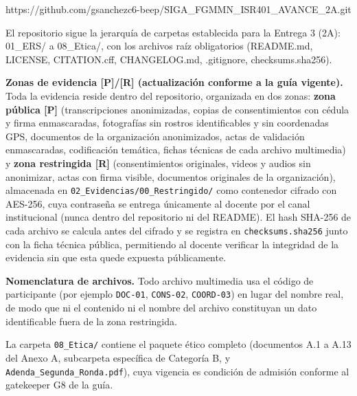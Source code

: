 
https://github.com/gsanchezc6-beep/SIGA\_FGMMN\_ISR401\_AVANCE\_2A.git


El repositorio sigue la jerarquía de carpetas establecida para la Entrega 3 (2A): 01\_ERS/ a 08\_Etica/, con los archivos raíz obligatorios (README.md, LICENSE, CITATION.cff, CHANGELOG.md, .gitignore, checksums.sha256).

\textbf{Zonas de evidencia [P]/[R] (actualización conforme a la guía vigente).} Toda la evidencia reside dentro del repositorio, organizada en dos zonas: \textbf{zona pública [P]} (transcripciones anonimizadas, copias de consentimientos con cédula y firma enmascaradas, fotografías sin rostros identificables y sin coordenadas GPS, documentos de la organización anonimizados, actas de validación enmascaradas, codificación temática, fichas técnicas de cada archivo multimedia) y \textbf{zona restringida [R]} (consentimientos originales, videos y audios sin anonimizar, actas con firma visible, documentos originales de la organización), almacenada en \texttt{02\_Evidencias/00\_Restringido/} como contenedor cifrado con AES-256, cuya contraseña se entrega únicamente al docente por el canal institucional (nunca dentro del repositorio ni del README). El hash SHA-256 de cada archivo se calcula antes del cifrado y se registra en \texttt{checksums.sha256} junto con la ficha técnica pública, permitiendo al docente verificar la integridad de la evidencia sin que esta quede expuesta públicamente.

\textbf{Nomenclatura de archivos.} Todo archivo multimedia usa el código de participante (por ejemplo \texttt{DOC-01}, \texttt{CONS-02}, \texttt{COORD-03}) en lugar del nombre real, de modo que ni el contenido ni el nombre del archivo constituyan un dato identificable fuera de la zona restringida.

La carpeta \texttt{08\_Etica/} contiene el paquete ético completo (documentos A.1 a A.13 del Anexo A, subcarpeta específica de Categoría B, y \texttt{Adenda\_Segunda\_Ronda.pdf}), cuya vigencia es condición de admisión conforme al gatekeeper G8 de la guía.
